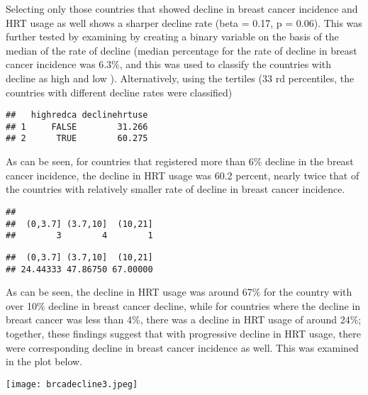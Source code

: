 \documentclass[]{article}
\newenvironment{Shaded}{\begin{snugshade}}{\end{snugshade}}
\newcommand{\KeywordTok}[1]{\textcolor[rgb]{0.13,0.29,0.53}{\textbf{{#1}}}}
\newcommand{\DataTypeTok}[1]{\textcolor[rgb]{0.13,0.29,0.53}{{#1}}}
\newcommand{\DecValTok}[1]{\textcolor[rgb]{0.00,0.00,0.81}{{#1}}}
\newcommand{\StringTok}[1]{\textcolor[rgb]{0.31,0.60,0.02}{{#1}}}
\newcommand{\NormalTok}[1]{{#1}}
\begin{document}
Selecting only those countries that showed decline in breast cancer
incidence and HRT usage as well shows a sharper decline rate (beta =
0.17, p = 0.06). This was further tested by examining by creating a
binary variable on the basis of the median of the rate of decline
(median percentage for the rate of decline in breast cancer incidence
was 6.3\%, and this was used to classify the countries with decline as
high and low ). Alternatively, using the tertiles (33 rd percentiles,
the countries with different decline rates were classified)

\begin{verbatim}
##   highredca declinehrtuse
## 1     FALSE        31.266
## 2      TRUE        60.275
\end{verbatim}

As can be seen, for countries that registered more than 6\% decline in
the breast cancer incidence, the decline in HRT usage was 60.2 percent,
nearly twice that of the countries with relatively smaller rate of
decline in breast cancer incidence.

\begin{verbatim}
## 
##  (0,3.7] (3.7,10]  (10,21] 
##        3        4        1
\end{verbatim}

\begin{verbatim}
##  (0,3.7] (3.7,10]  (10,21] 
## 24.44333 47.86750 67.00000
\end{verbatim}

As can be seen, the decline in HRT usage was around 67\% for the country
with over 10\% decline in breast cancer decline, while for countries
where the decline in breast cancer was less than 4\%, there was a
decline in HRT usage of around 24\%; together, these findings suggest
that with progressive decline in HRT usage, there were corresponding
decline in breast cancer incidence as well. This was examined in the
plot below.

\begin{Shaded}
\end{Shaded}

\texttt{[image: brcadecline3.jpeg]}
\end{document}
